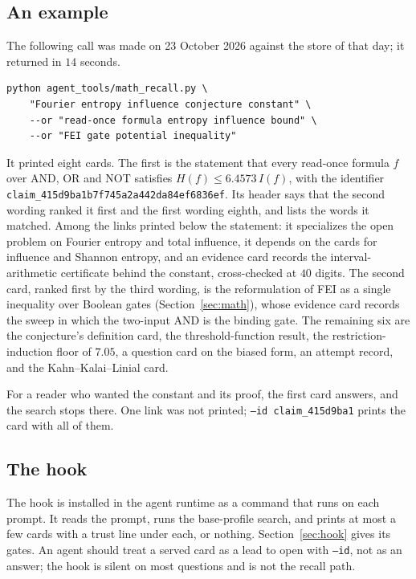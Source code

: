 \subsection{An example}
The following call was made on 23 October 2026 against the store of that day; it returned in $14$ seconds.
\begin{verbatim}
python agent_tools/math_recall.py \
    "Fourier entropy influence conjecture constant" \
    --or "read-once formula entropy influence bound" \
    --or "FEI gate potential inequality"
\end{verbatim}
It printed eight cards. The first is the statement that every read-once formula $f$ over AND, OR and NOT satisfies $H(f)\le 6.4573\,I(f)$, with the identifier \texttt{claim\_415d9ba1b7f745a2a442da84ef6836ef}. Its header says that the second wording ranked it first and the first wording eighth, and lists the words it matched. Among the links printed below the statement: it specializes the open problem on Fourier entropy and total influence, it depends on the cards for influence and Shannon entropy, and an evidence card records the interval-arithmetic certificate behind the constant, cross-checked at $40$ digits. The second card, ranked first by the third wording, is the reformulation of FEI as a single inequality over Boolean gates (Section~\ref{sec:math}), whose evidence card records the sweep in which the two-input AND is the binding gate. The remaining six are the conjecture's definition card, the threshold-function result, the restriction-induction floor of $7.05$, a question card on the biased form, an attempt record, and the Kahn--Kalai--Linial card.

For a reader who wanted the constant and its proof, the first card answers, and the search stops there. One link was not printed; \texttt{--id claim\_415d9ba1} prints the card with all of them.

\subsection{The hook}
The hook is installed in the agent runtime as a command that runs on each prompt. It reads the prompt, runs the base-profile search, and prints at most a few cards with a trust line under each, or nothing. Section~\ref{sec:hook} gives its gates. An agent should treat a served card as a lead to open with \texttt{--id}, not as an answer; the hook is silent on most questions and is not the recall path.

